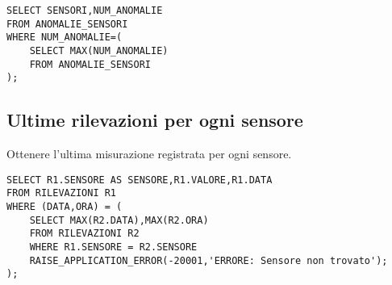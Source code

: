 \begin{description}
\begin{verbatim}
SELECT SENSORI,NUM_ANOMALIE
FROM ANOMALIE_SENSORI
WHERE NUM_ANOMALIE=(
    SELECT MAX(NUM_ANOMALIE)
    FROM ANOMALIE_SENSORI
);
\end{verbatim}
\subsection{Ultime rilevazioni per ogni sensore}
Ottenere l'ultima misurazione registrata per ogni sensore.
\begin{verbatim}
SELECT R1.SENSORE AS SENSORE,R1.VALORE,R1.DATA
FROM RILEVAZIONI R1
WHERE (DATA,ORA) = (
    SELECT MAX(R2.DATA),MAX(R2.ORA)
    FROM RILEVAZIONI R2
    WHERE R1.SENSORE = R2.SENSORE
    RAISE_APPLICATION_ERROR(-20001,'ERRORE: Sensore non trovato');
);
\end{verbatim}
\end{description}
